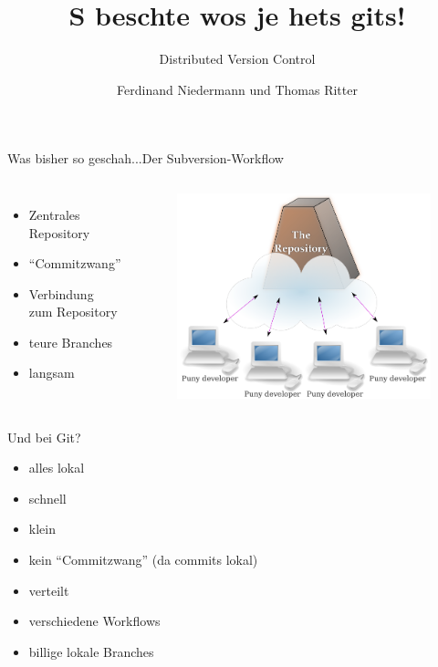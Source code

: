 \documentclass{beamer}
\author{Ferdinand Niedermann und Thomas Ritter}
\title{S beschte wos je hets \textbf{git}s!}
\subtitle{Distributed Version Control}
\begin{document}
\begin{frame}
 \maketitle
\end{frame}



\begin{frame}{Was bisher so geschah...}{Der Subversion-Workflow}

  \begin{columns}

      \begin{itemize}
    	\item Zentrales Repository
	\item ``Commitzwang''
	\item Verbindung zum Repository
	\item teure Branches
	\item langsam
      \end{itemize}

      \begin{figure}
       \includegraphics[width=1\textwidth]{./images/holy-repo.png}
      \end{figure}

  \end{columns}
\end{frame}

\begin{frame}[<+->]{Und bei Git?}{}
  \begin{itemize}
    \item alles lokal
    \item schnell
    \item klein
    \item kein ``Commitzwang'' (da commits lokal)
    \item verteilt
    \item verschiedene Workflows
    \item billige lokale Branches
  \end{itemize}
\end{frame}
\end{document}
